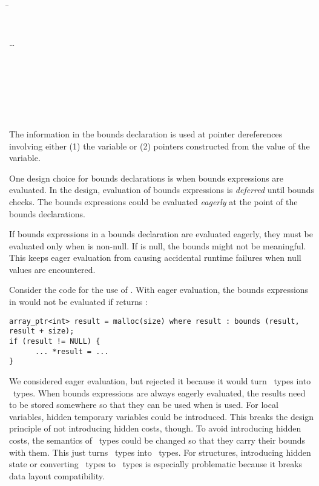 \begin{tabbing}
\= \\
\> \\
\> \code{=}  \\
\>\ldots{} \\
\\
 \\
\> \\
\> \\
\\
\\
\>\code{;}
\end{tabbing}

The information in the bounds declaration is used at pointer
dereferences involving either (1) the variable or (2) pointers
constructed from the value of the variable.

One design choice for bounds declarations is when
bounds expressions are evaluated.  In the design, evaluation of
bounds expressions is {\em deferred} until bounds checks.  The bounds
expressions could be evaluated {\em eagerly} at the point of the bounds declarations.

If bounds expressions in a bounds declaration  are evaluated 
eagerly, they must  be evaluated only when  is non-null. If  is null,
the bounds might not be meaningful.  This keeps eager evaluation from
causing accidental runtime failures when null values are encountered.    

Consider the code for the use of .   With eager evaluation,
the bounds expressions in  would not
be evaluated if  returns :
\begin{lstlisting}
array_ptr<int> result = malloc(size) where result : bounds (result, result + size);
if (result != NULL) {
      ... *result = ...
}
\end{lstlisting}

We considered eager evaluation, but rejected it because it would turn \arrayptr\
types into \spanptr\ types.  When bounds expressions are always eagerly
evaluated, the results need to be stored somewhere so that they can be used
when \var{v} is used.  For local variables, hidden temporary variables could be
introduced.  This breaks the design principle of not introducing hidden
costs, though.  To avoid introducing hidden costs, the semantics of \arrayptr\ types could 
be changed so that they carry their bounds with them.   This just turns \arrayptr\ types into 
\spanptr\ types.   For structures, introducing hidden state or converting \arrayptr\ types to 
\spanptr\ types is especially problematic because it breaks data layout compatibility.

